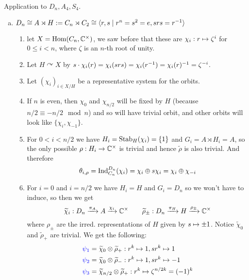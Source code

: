 \documentclass[a4paper]{article}
\begin{document}
\begin{exmp}
  Application to $D_{n}, A_{4}, S_{4}$.
  \begin{enumerate}[(a)]
    \item $D_{n} \cong A \rtimes H := C_{n} \rtimes C_{2} \cong \langle r, s \mid r^{n}=s^{2}=e, srs=r^{-1}\rangle$
          \begin{enumerate}[1.]
            \item let $X = \operatorname{Hom}(C_{n}, \mathbb C^\times)$, we saw before that these are $\chi_{i}: r \mapsto \zeta^{i}$ for $0 \le i < n$, where $\zeta$ is an $n$-th root of unity.
            \item Let $H \curvearrowright X$ by $s \cdot \chi_{i}(r) = \chi_{i}(srs) = \chi_{i}(r^{-1}) = \chi_{i}(r)^{-1} = \zeta^{-i}$.
            \item Let $(\chi_{i})_{i \in X/H}$ be a representative system for the orbits.
            \item If $n$ is even, then $\chi_{0}$ and $\chi_{n/2}$ will be fixed by $H$ (because $n/2 \equiv -n/2 \mod n$) and so will have trivial orbit, and other orbits will look like $\{\chi_{i}, \chi_{-1}\}$.
            \item For $0 < i < n/2$ we have $H_{i} = \operatorname{Stab}_{H}(\chi_{i}) = \{1\}$ and $G_{i} = A \rtimes H_{i} = A$, so the only possible $\rho: H_{i} \to \mathbb C^\times$ is trivial and hence $\tilde \rho$ is also trivial. And therefore
                  \[\theta_{i,\rho} = \operatorname{Ind}_{C_{n}}^{D_{n}}(\chi_{i}) = \chi_{i} \oplus s\chi_{i} = \chi_{i} \oplus \chi_{-i}\]
            \item For $i = 0$ and $i = n/2$ we have $H_{i} = H$ and $G_{i} = D_{n}$ so we won't have to induce, so then we get
                  \[\widetilde \chi_{i}: D_{n} \xrightarrow {\pi_{A}} A \xrightarrow {\chi_{i}} \mathbb C^\times \quad \quad \widetilde \rho_{\pm}: D_{n} \xrightarrow {\pi_{H}} H \xrightarrow {\rho_{\pm}} \mathbb C^\times\]
                  where $\rho_{\pm}$ are the irred. representations of $H$ given by $s \mapsto \pm 1$. Notice $\tilde \chi_{0}$ and $\tilde \rho_{+}$ are trivial. We get the following:
                  \begin{align*}
                    \color{blue} \psi_{1} &= \tilde \chi_{0} \otm \tilde \rho_{+}: r^{k} \mps 1, sr^{k} \mps 1 \\
                    \color{blue} \psi_{2} &= \tilde \chi_{0} \otm \tilde \rho_{-}: r^{k} \mps 1, sr^{k} \mps -1 \\
                    \color{blue} \psi_{3} &= \tilde \chi_{n/2} \otm \tilde \rho_{+}: r^{k} \mps \zeta^{n/2k} = (-1)^{k} \\

\end{align*}
\end{enumerate}
\end{enumerate}
\end{exmp}
\end{document}

